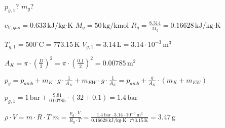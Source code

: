 \( p_{g,1} \)?  
\( m_g \)?  

\( c_{V,gas} = 0.633 \, \text{kJ/kg·K} \)  
\( M_g = 50 \, \text{kg/kmol} \)  
\( R_g = \frac{8.314}{M_g} = 0.16628 \, \text{kJ/kg·K} \)  

\( T_{g,1} = 500^\circ \text{C} = 773.15 \, \text{K} \)  
\( V_{g,1} = 3.14 \, \text{L} = 3.14 \cdot 10^{-3} \, \text{m}^3 \)  

\( A_K = \pi \cdot \left( \frac{D}{2} \right)^2 = \pi \cdot \left( \frac{0.1}{2} \right)^2 = 0.00785 \, \text{m}^2 \)  

\( p_g = p_{amb} + m_K \cdot g \cdot \frac{1}{A_K} + m_{EW} \cdot g \cdot \frac{1}{A_K} = p_{amb} + \frac{g}{A_K} \cdot (m_K + m_{EW}) \)  

\( p_{g,1} = 1 \, \text{bar} + \frac{9.81}{0.00785} \cdot (32 + 0.1) = 1.4 \, \text{bar} \)  

\( \rho \cdot V = m \cdot R \cdot T \)  
\( m = \frac{p_g \cdot V}{R_g \cdot T} = \frac{1.4 \, \text{bar} \cdot 3.14 \cdot 10^{-3} \, \text{m}^3}{0.16628 \, \text{kJ/kg·K} \cdot 773.15 \, \text{K}} = 3.47 \, \text{g} \)